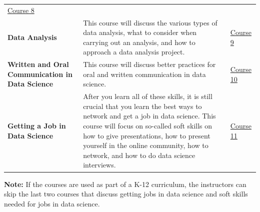 \documentclass[]{book}
\begin{document}
\begin{longtable}[]{@{}lll@{}}
\begin{minipage}[t]{0.12\columnwidth}
\href{https://leanpub.com/universities/courses/jhu/cbds-getting-data}{Course 8}\strut
\end{minipage}\tabularnewline
\begin{minipage}[t]{0.26\columnwidth}\raggedright
\textbf{Data Analysis}\strut
\end{minipage} & \begin{minipage}[t]{0.54\columnwidth}\raggedright
This course will discuss the various types of data analysis, what to consider when carrying out an analysis, and how to approach a data analysis project.\strut
\end{minipage} & \begin{minipage}[t]{0.12\columnwidth}\raggedright
\href{https://leanpub.com/universities/courses/jhu/cbds-analysis}{Course 9}\strut
\end{minipage}\tabularnewline
\begin{minipage}[t]{0.26\columnwidth}\raggedright
\textbf{Written and Oral Communication in Data Science}\strut
\end{minipage} & \begin{minipage}[t]{0.54\columnwidth}\raggedright
This course will discuss better practices for oral and written communication in data science.\strut
\end{minipage} & \begin{minipage}[t]{0.12\columnwidth}\raggedright
\href{https://leanpub.com/universities/courses/jhu/cbds-communication}{Course 10}\strut
\end{minipage}\tabularnewline
\begin{minipage}[t]{0.26\columnwidth}\raggedright
\textbf{Getting a Job in Data Science}\strut
\end{minipage} & \begin{minipage}[t]{0.54\columnwidth}\raggedright
After you learn all of these skills, it is still crucial that you learn the best ways to network and get a job in data science. This course will focus on so-called soft skills on how to give presentations, how to present yourself in the online community, how to network, and how to do data science interviews.\strut
\end{minipage} & \begin{minipage}[t]{0.12\columnwidth}\raggedright
\href{https://leanpub.com/universities/courses/jhu/cbds-getting-jobs}{Course 11}\strut
\end{minipage}\tabularnewline
\bottomrule
\end{longtable}

\textbf{Note:} If the courses are used as part of a K-12 curriculum, the instructors can skip the last two courses that discuss getting jobs in data science and soft skills needed for jobs in data science.
\end{document}
